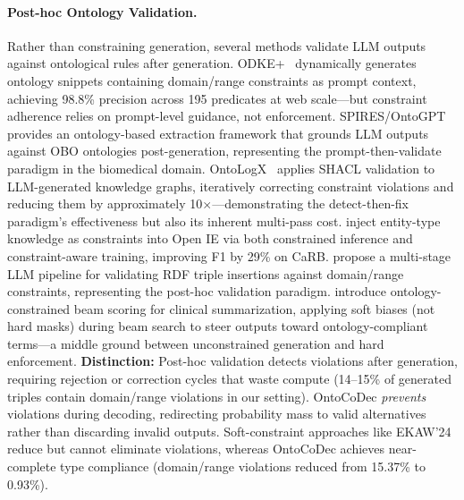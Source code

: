 \paragraph{Post-hoc Ontology Validation.}
Rather than constraining generation, several methods validate LLM outputs against ontological rules after generation.
%
ODKE+~\cite{khorshidi2025odke} dynamically generates ontology snippets containing domain/range constraints as prompt context, achieving 98.8\% precision across 195 predicates at web scale---but constraint adherence relies on prompt-level guidance, not enforcement.
%
SPIRES/OntoGPT~\cite{spires_2024} provides an ontology-based extraction framework that grounds LLM outputs against OBO ontologies post-generation, representing the prompt-then-validate paradigm in the biomedical domain.
%
OntoLogX~\cite{ontologx_2025} applies SHACL validation to LLM-generated knowledge graphs, iteratively correcting constraint violations and reducing them by approximately 10$\times$---demonstrating the detect-then-fix paradigm's effectiveness but also its inherent multi-pass cost.
%
\citet{upadhyay2023openie} inject entity-type knowledge as constraints into Open IE via both constrained inference and constraint-aware training, improving F1 by 29\% on CaRB.
%
\citet{regino2025kgcurator} propose a multi-stage LLM pipeline for validating RDF triple insertions against domain/range constraints, representing the post-hoc validation paradigm.
%
\citet{ekaw2024_ontology_beam} introduce ontology-constrained beam scoring for clinical summarization, applying soft biases (not hard masks) during beam search to steer outputs toward ontology-compliant terms---a middle ground between unconstrained generation and hard enforcement.
%
\textbf{Distinction:} Post-hoc validation detects violations after generation, requiring rejection or correction cycles that waste compute (14--15\% of generated triples contain domain/range violations in our setting). OntoCoDec \emph{prevents} violations during decoding, redirecting probability mass to valid alternatives rather than discarding invalid outputs. Soft-constraint approaches like EKAW'24 reduce but cannot eliminate violations, whereas OntoCoDec achieves near-complete type compliance (domain/range violations reduced from 15.37\% to 0.93\%).


